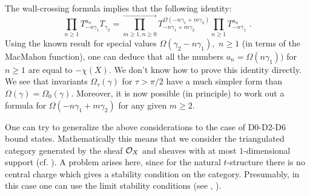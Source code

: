 \documentclass[12pt]{article}
\begin{document}
The wall-crossing formula  implies that the following identity:
$$\prod_{n\geqslant 1}T_{-n\gamma_1}^{a_n}T_{\gamma_2}=\prod_{m\geqslant 1,n\geqslant 0}^{\longrightarrow}T_{-n\gamma_1+m\gamma_2}^{\Omega(-n\gamma_1+m\gamma_2)}\prod_{n\geqslant 1}T_{-n\gamma_1}^{a_n}\,\,.$$
 Using the known result for special values $\Omega(\gamma_2-n \gamma_1),\,\,n\geqslant 1$ (in terms of the MacMahon function), one can deduce that 
all the numbers
$a_n=\Omega(n\gamma_1))$ for $n\geqslant 1$ are equal to $-\chi(X)$. We don't know how to prove this identity directly.
We see that invariants $\Omega_\tau(\gamma)$ for $\tau >\pi/2$ have a much simpler form than $\Omega(\gamma)=\Omega_0(\gamma)$.
 Moreover, it is now possible (in principle) to  work out a formula for $\Omega(-n\gamma_1+m\gamma_2)$ for any given $m\geqslant 2$.

\begin{rmk} One can try to generalize the above considerations to the case of D0-D2-D6 bound states. Mathematically this means that we consider the triangulated category generated by the sheaf ${\cal O}_X$ and sheaves with at most $1$-dimensional support (cf. \cite{MaNOP}). A problem arises here, since for the natural $t$-structure there is no central charge which gives a stability condition on the category. Presumably, in this case one can use the limit stability conditions (see \cite{Ba}, \cite{Tod1}).


\end{rmk}
\end{document}
